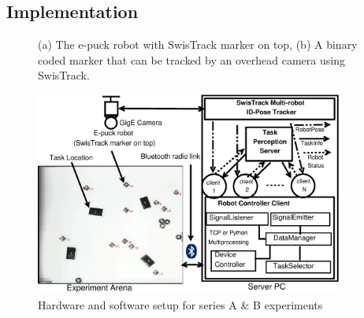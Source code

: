 \documentclass[final,5p,times,twocolumn]{elsarticle}
\begin{document}
\subsection{Implementation}
\label{afm:impl}
\begin{figure}
\centering
{} 
\hspace{1cm}
\caption{(a) The e-puck robot with SwisTrack marker on top, (b) A binary coded marker that can be tracked by an overhead camera  using SwisTrack.}
\label{fig:e-puck}
\end{figure}
\begin{figure}
\centering
\includegraphics[width=0.9\textwidth, angle=0]
{./images/RIL-Expt-Setup1.eps}
\caption{Hardware and software setup for series A \& B experiments}
\label{fig:RIL-Expt-Setup1} %
\end{figure}
\end{document}
